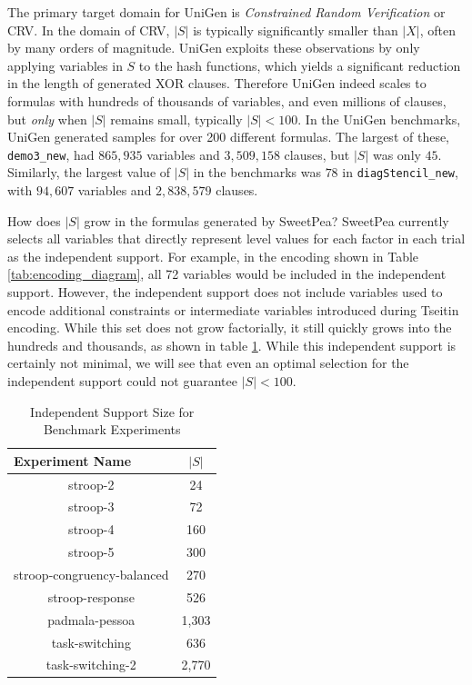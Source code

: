 The primary target domain for UniGen is \textit{Constrained Random Verification} or CRV. In the domain of CRV, $|S|$ is typically significantly smaller than $|X|$, often by many orders of magnitude. UniGen exploits these observations by only applying variables in $S$ to the hash functions, which yields a significant reduction in the length of generated XOR clauses. Therefore UniGen indeed scales to formulas with hundreds of thousands of variables, and even millions of clauses, but \textit{only} when $|S|$ remains small, typically $|S| < 100$. In the UniGen benchmarks, UniGen generated samples for over 200 different formulas. The largest of these, \texttt{demo3\_new}, had $865,935$ variables and $3,509,158$ clauses, but $|S|$ was only $45$. Similarly, the largest value of $|S|$ in the benchmarks was $78$ in \texttt{diagStencil\_new}, with $94,607$ variables and $2,838,579$ clauses. \cite{chakraborty_parallel_2015}

How does $|S|$ grow in the formulas generated by SweetPea? SweetPea currently selects all variables that directly represent level values for each factor in each trial as the independent support. For example, in the encoding shown in Table \ref{tab:encoding_diagram}, all 72 variables would be included in the independent support. However, the independent support does not include variables used to encode additional constraints or intermediate variables introduced during Tseitin encoding. While this set does not grow factorially, it still quickly grows into the hundreds and thousands, as shown in table \ref{tab:benchmark_experiments_support}. While this independent support is certainly not minimal, we will see that even an optimal selection for the independent support could not guarantee $|S| < 100$.

\begin{table}[htb]
  \centering
  \caption{Independent Support Size for Benchmark Experiments}
\begin{tabular}{|c|c|}
\hline
\multicolumn{1}{|l|}{Experiment Name}  & $|S|$   \\ \hline
stroop-2                               & 24      \\ \hline
stroop-3                               & 72      \\ \hline
stroop-4                               & 160     \\ \hline
stroop-5                               & 300     \\ \hline
stroop-congruency-balanced             & 270     \\ \hline
stroop-response                        & 526     \\ \hline
padmala-pessoa                         & 1,303   \\ \hline
task-switching                         & 636     \\ \hline
task-switching-2                       & 2,770   \\ \hline
\end{tabular}
\label{tab:benchmark_experiments_support}%
\end{table}



